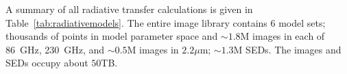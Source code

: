 
A summary of all radiative transfer calculations is given in Table~\ref{tab:radiativemodels}. The entire image library
contains $6$ model sets; thousands of points in model parameter space and
$\sim 1.8$M images in each of 86~GHz, 230~GHz, and $\sim0.5$M images in $2.2\mu$m;
$\sim1.3$M SEDs.  The images and SEDs occupy about $50$TB.

